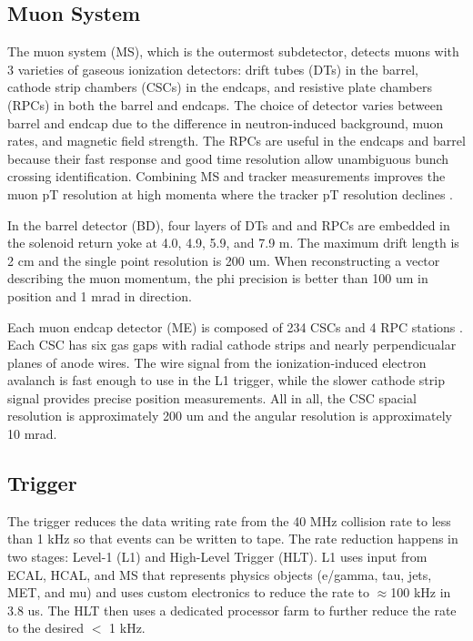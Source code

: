 \documentclass[12pt]{article}
\begin{document}
\subsection{Muon System}
    The muon system (MS), which is the outermost subdetector, detects muons with 3 varieties of gaseous ionization detectors: drift tubes (DTs) in the barrel, cathode strip chambers (CSCs) in the endcaps, and resistive plate chambers (RPCs) in both the barrel and endcaps. The choice of detector varies between barrel and endcap due to the difference in neutron-induced background, muon rates, and magnetic field strength. The RPCs are useful in the endcaps and barrel because their fast response and good time resolution allow unambiguous bunch crossing identification. Combining MS and tracker measurements improves the muon pT resolution at high momenta where the tracker pT resolution declines .

    In the barrel detector (BD), four layers of DTs and and RPCs are embedded in the solenoid return yoke at 4.0, 4.9, 5.9, and 7.9 m.  The maximum drift length is 2 cm and the single point resolution is 200 um. When reconstructing a vector describing the muon momentum, the phi precision is better than 100 um in position and 1 mrad in direction. 

    Each muon endcap detector (ME) is composed of 234 CSCs and 4 RPC stations . Each CSC has six gas gaps with radial cathode strips and nearly perpendicualar planes of anode wires. The wire signal from the ionization-induced electron avalanch is fast enough to use in the L1 trigger, while the slower  cathode strip signal provides precise  position measurements. All in all, the CSC spacial resolution is approximately 200 um and the angular resolution is approximately 10 mrad.

\subsection{Trigger}
    The trigger reduces the data writing rate from the 40 MHz collision rate to less than 1 kHz so that events can be written to tape. The rate reduction happens in two stages: Level-1 (L1) and High-Level Trigger (HLT). L1 uses input from ECAL, HCAL, and MS that represents physics objects (e/gamma, tau, jets, MET, and mu) and uses custom electronics to reduce the rate to $\approx$100 kHz in 3.8 us. The HLT then uses a dedicated processor farm to further reduce the rate to the desired $<$ 1 kHz.
\end{document}
